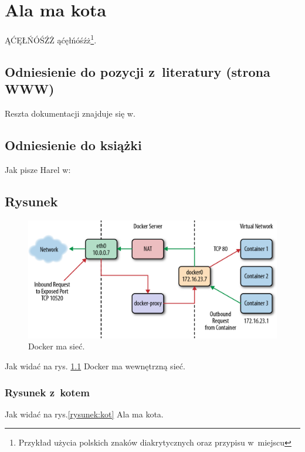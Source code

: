 \chapter{Ala ma kota}

ĄĆĘŁŃÓŚŹŻ ąćęłńóśźż\footnote{Przykład użycia polskich znaków diakrytycznych oraz przypisu w~miejscu}. \lipsum[1]

\section{Odniesienie do pozycji z~literatury (strona WWW)}

Reszta dokumentacji znajduje się w\cite{docker_compose_reference}. \lipsum[3]

\section{Odniesienie do książki}

Jak pisze Harel w\cite{harel_rzecz_2008}: \lipsum[7]

\section{Rysunek}

\begin{figure}
    \centering\includegraphics[width=.6\textwidth]{img/swarm-network}
    \caption{Docker ma sieć\cite{docker_compose_reference}.}  \label{rys:network}
\end{figure}

Jak widać na rys. \ref{rys:network} Docker ma wewnętrzną sieć. \lipsum[1]


\subsection{Rysunek z~kotem}

Jak widać na rys.\ref{rysunek:kot} Ala ma kota. \lipsum[9-10]


